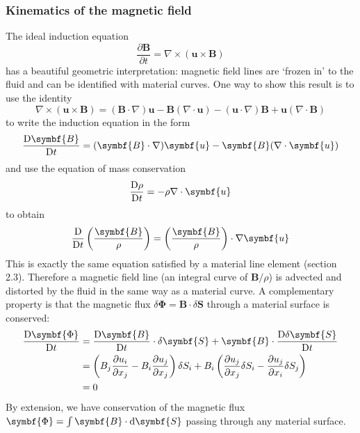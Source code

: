\documentclass{jknotes}
\newcommand{\B}{\symbf{B}}
\renewcommand{\u}{\symbf{u}}
\newcommand{\flux}{\symbf{\Phi}}
\begin{document}
\subsubsection{Kinematics of the magnetic field}
The ideal induction equation
\begin{equation}
	\frac{\partial \symbf{B}}{\partial t} = \nabla \times (\u \times
	\B)
\end{equation}
has a beautiful geometric interpretation: magnetic field lines are `frozen in'
to the fluid and can be identified with material curves. One way to show this
result is to use the identity
\begin{equation}
	\nabla \times (\u \times \B) = (\B \cdot \nabla)\u - \B(\nabla\cdot\u) -
	(\u\cdot\nabla)\B + \u(\nabla \cdot \B)
\end{equation}
to write the induction equation in the form
\begin{equation}
	\frac{\diffD \B}{\diffD t} = (\B \cdot \nabla) \u - \B (\nabla \cdot \u)
\end{equation}
and use the equation of mass conservation
\begin{equation}
	\frac{\diffD \rho}{\diffD t} = - \rho \nabla \cdot \u
\end{equation}
to obtain
\begin{equation}
	\frac{\diffD}{\diffD t} \left( \frac{\B}{\rho}\right) =
	\left(\frac{\B}{\rho}\right)\cdot\nabla\u
\end{equation}
This is exactly the same equation satisfied by a material line element
(section 2.3). Therefore a magnetic field line (an integral curve of
$\B/\rho$) is advected and distorted by the fluid in the same way as a
material curve. A complementary property is that the magnetic flux $\delta
\flux = \B \cdot \delta\symbf{S}$ through a material surface is conserved:
\begin{align}
	\frac{\diffD \flux}{\diffD t} &= \frac{\diffD \B}{\diffD t} \cdot \delta
	\symbf{S} + \B \cdot \frac{\diffD \delta \symbf{S}}{\diffD t} \\ 
								  &= \left( B_j \frac{\partial u_i}{\partial
								  x_j} - B_i \frac{\partial u_j}{\partial x_j}
								  \right) \delta S_i + B_i \left(
								  \frac{\partial u_j}{\partial x_j} \delta S_i
								  - \frac{\partial u_j}{\partial x_i} \delta
								  S_j\right) \\
								  &= 0
\end{align}
By extension, we have conservation of the magnetic flux $\flux = \int \B \cdot
\diffd \symbf{S}$ passing through any material surface.
\end{document}
